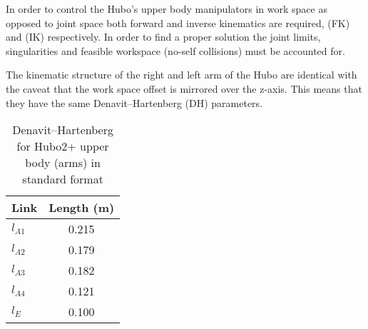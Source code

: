 In order to control the Hubo's upper body manipulators in work space as opposed to joint space both forward and inverse kinematics are required, (FK) and (IK) respectively.
In order to find a proper solution the joint limits, singularities and feasible workspace (no-self collisions) must be accounted for.

The kinematic structure of the right and left arm of the Hubo are identical with the caveat that the work space offset is mirrored over the z-axis.
This means that they have the same Denavit–Hartenberg (DH) parameters.

\begin{table}
\centering
\caption{Denavit–Hartenberg for Hubo2+ upper body (arms) in standard format}
\begin{tabular}{|l | c|}
\hline
Link     & Length (m) \\
\hline
\hline
$l_{A1}$ & 0.215 \\
\hline
$l_{A2}$ & 0.179 \\
\hline
$l_{A3}$ & 0.182 \\
\hline
$l_{A4}$ & 0.121 \\
\hline
$l_{E}$ & 0.100 \\

\hline

\end{tabular}\label{table:DHupper}
\end{table}


